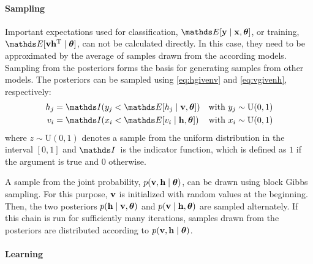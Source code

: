 \documentclass{report}
\begin{document}
\paragraph{Sampling}
Important expectations used for classification, $\E[\vect{y} \given
\vect{x}, \thetas]$, or training, $\E[\vect{v}\vect{h}^\text{T}\given
\thetas]$, can not be calculated directly. In this case, they need to be
approximated by the average of samples drawn from the according models. Sampling
from the posteriors forms the basis for generating samples from other models.
The posteriors can be sampled using \ref{eq:hgivenv} and \ref{eq:vgivenh},
respectively:
\begin{align}
h_j &= \I(y_j < \E[h_j \given \vect{v}, \thetas]) & \text{with $y_j \sim
\text{U}(0,1)$}\\
v_i &= \I(x_i < \E[v_i \given \vect{h}, \thetas]) & \text{with $x_i \sim
\text{U}(0,1)$}
\end{align}
where $z \sim \text{U}(0,1)$ denotes a sample from the uniform distribution in
the interval $[0,1]$ and $\I$~is the indicator function, which is defined as $1$ if
the argument is true and $0$ otherwise.

A sample from the joint probability, $p(\mathbf{v}, \mathbf{h} \mid \boldsymbol{\theta})$, can
be drawn using block Gibbs sampling. For this purpose, $\mathbf{v}$ is initialized
with random values at the beginning. Then, the two posteriors $p(\mathbf{h}
\mid \mathbf{v}, \boldsymbol{\theta})$ and $p(\mathbf{v} \mid \mathbf{h}, \boldsymbol{\theta})$ are
sampled alternately. If this chain is run for sufficiently many iterations,
samples drawn from the posteriors are distributed according to $p(\mathbf{v},
\mathbf{h} \mid \boldsymbol{\theta})$.

\paragraph{Learning}
\end{document}

